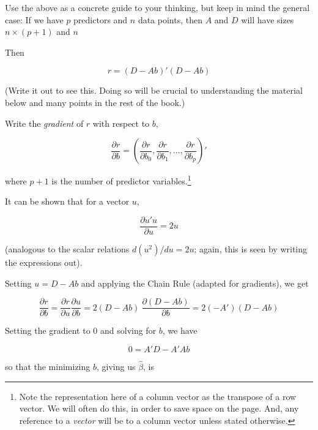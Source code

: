 Use the above as a concrete guide to your thinking, but keep in mind the
general case:  If we have $p$ predictors and $n$ data points, then $A$
and $D$ will have sizes $n \times (p+1)$ and $n$

Then

\begin{equation}
\label{}
r = (D - A b)' (D - Ab)
\end{equation}

(Write it out to see this.  Doing so will be crucial to understanding
the material below and many points in the rest of the book.)

Write the \textit{gradient} of $r$ with respect to $b$,

\begin{equation}
\frac{\partial r}{\partial b} = (
\frac{\partial r}{\partial b_0},
\frac{\partial r}{\partial b_1},
...,
\frac{\partial r}{\partial b_p}
)'
\end{equation}

where $p+1$ is the number of predictor variables.\footnote{Note the
representation here of a column vector as the transpose of a row vector.
We will often do this, in order to save space on the page.  And, any
reference to a \textit{vector} will be to a column vector unless stated
otherwise.}

It can be shown that for a vector $u$, 

\begin{equation}
\frac{\partial u'u}{\partial u} = 2u
\end{equation}

(analogous to the scalar relations $d (u^2) /du = 2u$; again, this is
seen by writing the expressions out).

Setting $u = D - Ab$ and applying the Chain Rule (adapted for
gradients), we get

\begin{equation}
\frac{\partial r}{\partial b} = 
\frac{\partial r}{\partial u} 
\frac{\partial u}{\partial b} =
2(D - Ab) ~ \frac{\partial (D - Ab)}{\partial b}=
2 (-A') (D - Ab) 
\end{equation}

Setting the gradient to 0 and solving for $b$, we have

\begin{equation}
\label{adaab}
0 = A'D - A'Ab
\end{equation}  

so that the minimizing $b$, giving us $\widehat{\beta}$, is

